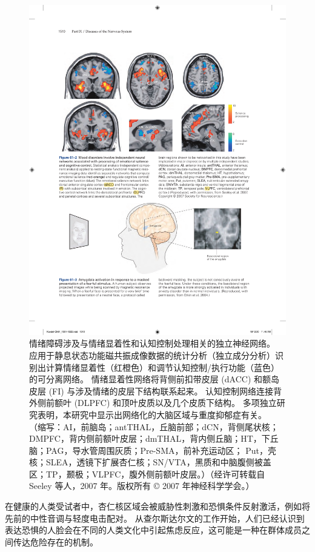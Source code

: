 \begin{figure}[htbp]
	\centering
	\includegraphics[width=0.9\linewidth]{chap61/fig_61_2}
	\caption{情绪障碍涉及与情绪显着性和认知控制处理相关的独立神经网络。 应用于静息状态功能磁共振成像数据的统计分析（独立成分分析）识别出计算情绪显着性（红橙色）和调节认知控制/执行功能（蓝色）的可分离网络。 情绪显着性网络将背侧前扣带皮层 (dACC) 和额岛皮层 (FI) 与涉及情绪的皮层下结构联系起来。 认知控制网络连接背外侧前额叶 (DLPFC) 和顶叶皮质以及几个皮质下结构。 多项独立研究表明，本研究中显示出网络化的大脑区域与重度抑郁症有关。 （缩写：AI，前脑岛；antTHAL，丘脑前部；dCN，背侧尾状核；DMPFC，背内侧前额叶皮层；dmTHAL，背内侧丘脑；HT，下丘脑；PAG，导水管周围灰质；Pre-SMA，前补充运动区； Put，壳核；SLEA，透镜下扩展杏仁核；SN/VTA，黑质和中脑腹侧被盖区；TP，颞极；VLPFC，腹外侧前额叶皮层。）（经许可转载自 Seeley 等人，2007 年。版权所有 © 2007 年神经科学学会。）}
	\label{fig:61_2}
\end{figure}


在健康的人类受试者中，杏仁核区域会被威胁性刺激和恐惧条件反射激活，例如将先前的中性音调与轻度电击配对。
从查尔斯达尔文的工作开始，人们已经认识到表达恐惧的人脸会在不同的人类文化中引起焦虑反应，这可能是一种在群体成员之间传达危险存在的机制。


